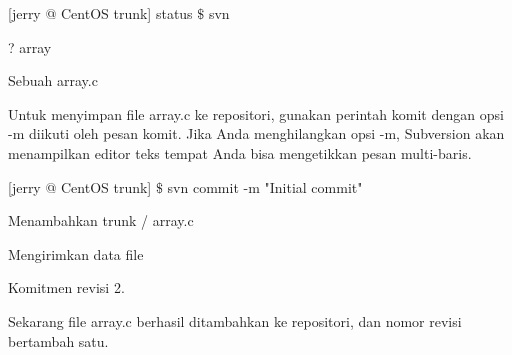 \noindent 
 \hspace*{0.5in} [jerry @ CentOS trunk] status  $  \$  $ svn \par
\noindent 
 \hspace*{0.5in} ? array \par
\noindent 
Sebuah array.c \par
\vspace{12pt}
\vspace{12pt}
\vspace{12pt}
\vspace{12pt}
\noindent 
Untuk menyimpan file array.c ke repositori, gunakan perintah komit dengan opsi -m diikuti oleh pesan komit. Jika Anda menghilangkan opsi -m, Subversion akan menampilkan editor teks tempat Anda bisa mengetikkan pesan multi-baris. \par
\noindent 
 \hspace*{0.5in} [jerry @ CentOS trunk]  $  \$  $ svn commit -m "Initial commit" \par
\noindent 
Menambahkan trunk / array.c \par
\noindent 
Mengirimkan data file \par
\noindent 
Komitmen revisi 2. \par
\noindent 
Sekarang file array.c berhasil ditambahkan ke repositori, dan nomor revisi bertambah satu. \par

